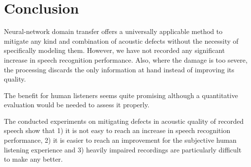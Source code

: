 \documentclass[conference]{IEEEtran}
\begin{document}
%
%
%
%
%

\section{Conclusion}

Neural-network domain transfer offers a universally applicable method to
mitigate any kind and combination of acoustic defects without the necessity
of specifically modeling them. However,
we have not recorded any significant increase in speech recognition performance.
Also, where the damage is too severe, the processing discards the only
information at hand instead of improving its quality.

The benefit for human listeners seems quite promising although a quantitative
evaluation would be needed to assess it properly.

The conducted experiments on mitigating defects in acoustic quality of recorded speech
show that 1) it is not easy to reach an increase in speech recognition
performance, 2) it is easier to reach an improvement for the subjective
human listening experience and 3) heavily impaired recordings are particularly difficult to
make any better.
\end{document}
